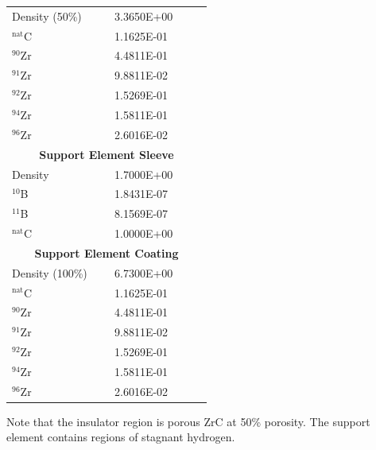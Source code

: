 \documentclass[8pt,a4paper]{article}
\begin{document}
\begin{longtable}{|m{0.3\linewidth}|m{0.2\linewidth}|}
    Density (50\%) & \SI{3.3650E+00}{} \\
    $^{\text{nat}}$C & \SI{1.1625E-01}{} \\
    $^{90}$Zr & \SI{4.4811E-01}{} \\
    $^{91}$Zr & \SI{9.8811E-02}{} \\
    $^{92}$Zr & \SI{1.5269E-01}{} \\
    $^{94}$Zr & \SI{1.5811E-01}{} \\
    $^{96}$Zr & \SI{2.6016E-02}{} \\\hline
    \multicolumn{2}{|c|}{\textbf{Support Element Sleeve}}\\\hline
    Density & \SI{1.7000E+00}{} \\
    $^{10}$B & \SI{1.8431E-07}{} \\
    $^{11}$B & \SI{8.1569E-07}{} \\
    $^{\text{nat}}$C & \SI{1.0000E+00}{} \\\hline
    \multicolumn{2}{|c|}{\textbf{Support Element Coating}}\\\hline
    Density (100\%) & \SI{6.7300E+00}{} \\
    $^{\text{nat}}$C & \SI{1.1625E-01}{} \\
    $^{90}$Zr & \SI{4.4811E-01}{} \\
    $^{91}$Zr & \SI{9.8811E-02}{} \\
    $^{92}$Zr & \SI{1.5269E-01}{} \\
    $^{94}$Zr & \SI{1.5811E-01}{} \\
    $^{96}$Zr & \SI{2.6016E-02}{} \\
\end{longtable}

Note that the insulator region is porous ZrC at 50\% porosity. The support
element contains regions of stagnant hydrogen.
\end{document}
